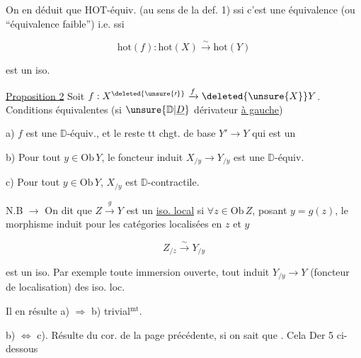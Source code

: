 
On en déduit que   $\mathrm{HOT}$-équiv. (au sens de la def. 1) ssi c'est une équivalence (ou ``équivalence faible'') i.e. ssi

\[ \mathrm{hot}(f):\mathrm{hot}(X)\xrightarrow{\sim}\mathrm{hot}(Y) \]

est un iso.

 \uline{Proposition 2} Soit $f:X^{\deleted{\unsure{\prime}}}\xrightarrow{f}\deleted{\unsure{X}}Y$. Conditions équivalentes (si $\unsure{\mathbb D|\underline D}$ dérivateur \uline{à gauche})

a) $f$ est une $\mathbb D$-équiv., et le reste   tt chgt. de base $Y'\longrightarrow Y$ qui est un   


b)  Pour tout $y\in\mathrm{Ob}\,Y$, le foncteur induit $X_{/y}\longrightarrow Y_{/y}$ est une $\mathbb D$-équiv.

c) Pour tout $y\in\mathrm{Ob}\,Y$, $X_{/y}$ est $\mathbb D$-contractile.

 N.B $\rightarrow$ On dit que $Z\xrightarrow{g}Y$ est un \uline{iso. local} si $\forall z\in\mathrm{Ob}\,Z$, posant $y=g(z)$, le morphisme induit pour les  catégories localisées en $z$ et $y$

\[ Z_{/z}\xrightarrow{\sim}Y_{/y} \]

est un iso. Par exemple toute immersion ouverte, tout   induit $Y_{/y}\longrightarrow Y$ (foncteur de localisation)  des iso. loc.

Il en résulte a) $\Rightarrow$ b) trivial$^{\mathrm{mt}}$.

b) $\Leftrightarrow$ c). Résulte du cor. de la page précédente, si on sait que . Cela   Der 5 ci-dessous

